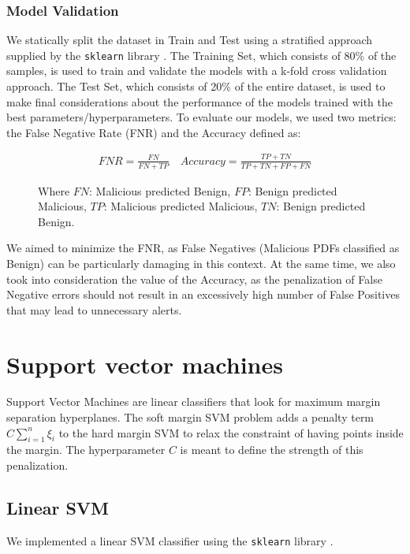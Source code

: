 \documentclass[twocolumn, switch]{article} %
\begin{document}
\subsubsection{Model Validation}
We statically split the dataset in Train and Test using a stratified approach supplied by the \texttt{sklearn} library \cite{scikit-learn}. The Training Set, which consists of 80\% of the samples, is used to train and validate the models with a k-fold cross validation approach. The Test Set, which consists of 20\% of the entire dataset, is used to make final considerations about the performance of the models trained with the best parameters/hyperparameters.
To evaluate our models, we used two metrics: the False Negative Rate (FNR) and the Accuracy defined as:
\begin{figure}[ht!]
	\begin{align*}
		FNR = \frac{FN}{FN + TP} \quad Accuracy = \frac{TP+TN}{TP+TN+FP+FN}
	\end{align*}
	\caption*{\footnotesize{Where $FN$: Malicious predicted Benign, $FP$: Benign predicted Malicious, $TP$: Malicious predicted Malicious, $TN$: Benign predicted Benign.}}
\end{figure}
We aimed to minimize the FNR, as False Negatives (Malicious PDFs classified as Benign) can be particularly damaging in this context.
At the same time, we also took into consideration the value of the Accuracy, as the penalization of False Negative errors should not result in an excessively high number of False Positives that may lead to unnecessary alerts.

\section{Support vector machines}
\label{sec:svm}
Support Vector Machines are linear classifiers that look for maximum margin separation hyperplanes.
The soft margin SVM problem adds a penalty term $C\sum_{i=1}^{n}\xi_i$ to the hard margin SVM to relax the constraint of having points inside the margin. The hyperparameter $C$ is meant to define the strength of this penalization.
\subsection{Linear SVM}
We implemented a linear SVM classifier using the \texttt{sklearn} library \cite{scikit-learn}.
\end{document}
